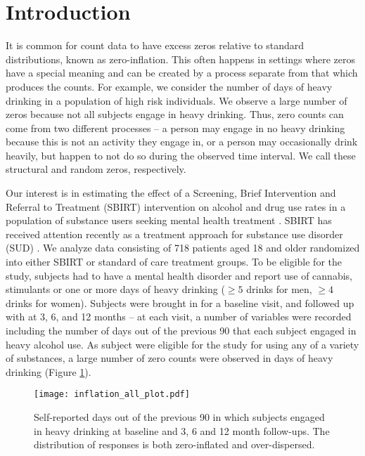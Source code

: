 \documentclass[12pt]{article}
\begin{document}
\section{Introduction}
\label{s:intro}


It is common for count data to have excess zeros relative to standard distributions, known as zero-inflation. This often happens in settings where zeros have a special meaning and can be created by a process separate from that which produces the counts. For example, we consider the number of days of heavy drinking in a population of high risk individuals. We observe a large number of zeros because not all subjects engage in heavy drinking. Thus, zero counts can come from two different processes -- a person may engage in no heavy drinking because this is not an activity they engage in, or a person may occasionally drink heavily, but happen to not do so during the observed time interval. We call these structural and random zeros, respectively.

Our interest is in estimating the effect of a Screening, Brief Intervention and Referral to Treatment (SBIRT) intervention on alcohol and drug use rates in a population of substance users seeking mental health treatment \citep{karno2021effect}. SBIRT has received attention recently as a treatment approach for substance use disorder (SUD) \citep{saitz2014screening, glass2015specialty, barata2017effectiveness, tetrault2020computerized}. We analyze data consisting of 718 patients aged 18 and older randomized into either SBIRT or standard of care treatment groups. To be eligible for the study, subjects had to have a mental health disorder and report use of cannabis, stimulants or one or more days of heavy drinking ($\geq 5$ drinks for men, $\geq 4$ drinks for women). Subjects were brought in for a baseline visit, and followed up with at 3, 6, and 12 months -- at each visit, a number of variables were recorded including the number of days out of the previous 90 that each subject engaged in heavy alcohol use. As subject were eligible for the study for using any of a variety of substances, a large number of zero counts were observed in days of heavy drinking (Figure \ref{fig:inflation}).

\begin{figure}[ht]
	\centering
	\texttt{[image: inflation\_all\_plot.pdf]}
	\caption{Self-reported days out of the previous 90 in which subjects engaged in heavy drinking at baseline and 3, 6 and 12 month follow-ups. The distribution of responses is both zero-inflated and over-dispersed.}
	\label{fig:inflation}
\end{figure}
\end{document}

